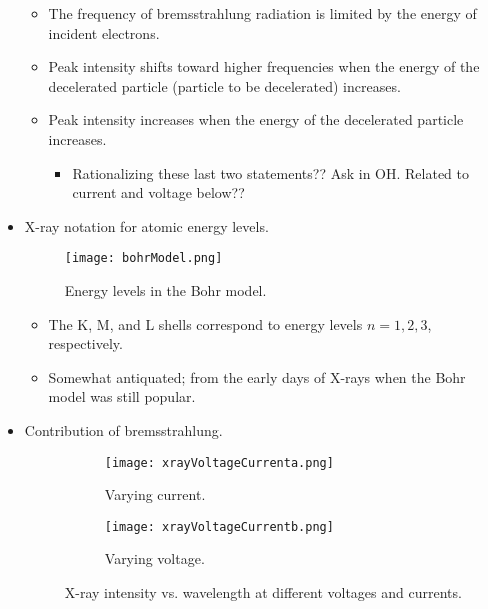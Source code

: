 \documentclass[../notes.tex]{subfiles}
\begin{document}
\begin{itemize}
\begin{itemize}
        \item The frequency of bremsstrahlung radiation is limited by the energy of incident electrons.
        \item Peak intensity shifts toward higher frequencies when the energy of the decelerated particle (particle to be decelerated) increases.
        \item Peak intensity increases when the energy of the decelerated particle increases.
        \begin{itemize}
            \item Rationalizing these last two statements?? Ask in OH. Related to current and voltage below??
        \end{itemize}
    \end{itemize}
    \item X-ray notation for atomic energy levels.
    \begin{figure}[H]
        \centering
        \texttt{[image: bohrModel.png]}
        \caption{Energy levels in the Bohr model.}
        \label{fig:bohrModel}
    \end{figure}
    \begin{itemize}
        \item The K, M, and L shells correspond to energy levels $n=1,2,3$, respectively.
        \item Somewhat antiquated; from the early days of X-rays when the Bohr model was still popular.
    \end{itemize}
    \item Contribution of bremsstrahlung.
    \begin{figure}[h!]
        \centering
        \begin{subfigure}[b]{0.49\linewidth}
            \centering
            \texttt{[image: xrayVoltageCurrenta.png]}
            \caption{Varying current.}
            \label{fig:xrayVoltageCurrenta}
        \end{subfigure}
        \begin{subfigure}[b]{0.49\linewidth}
            \centering
            \texttt{[image: xrayVoltageCurrentb.png]}
            \caption{Varying voltage.}
            \label{fig:xrayVoltageCurrentb}
        \end{subfigure}
        \caption{X-ray intensity vs. wavelength at different voltages and currents.}
        \label{fig:xrayVoltageCurrent}
    \end{figure}
    \begin{itemize}

\end{itemize}
\end{itemize}
\end{document}
